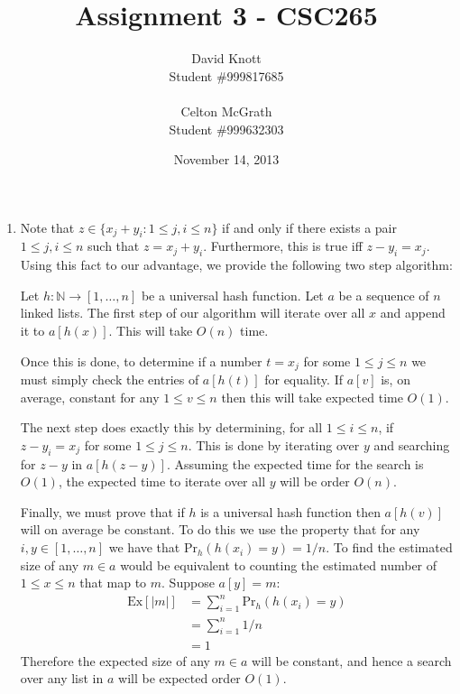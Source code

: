 \documentclass[letterpaper,10pt]{article}
\begin{document}
\title{Assignment 3 - CSC265}
\author{David Knott \\ Student \#999817685 \\ \vspace{-1mm} \\  Celton McGrath \\ Student \#999632303}
\date{November 14, 2013}
\maketitle
\begin{enumerate}
  \item Note that $z \in \{x_j + y_i : 1 \leq j, i \leq n \}$ if and only if there exists a pair $1 \leq j, i \leq n $ such that $z = x_j + y_i$. Furthermore, this is true iff $z - y_i = x_j$. Using this fact to our advantage, we provide the following two step algorithm:

  Let $h : \mathbb{N} \to [1,\dots, n] $ be a universal hash function. Let $a$ be a sequence of $n$ linked lists. The first step of our algorithm will iterate over all $x$ and append it to $a[h(x)]$. This will take $O(n)$ time.

  Once this is done, to determine if a number $t = x_j$ for some $1 \leq j \leq n$ we must simply check the entries of $a[h(t)]$ for equality. If $a[v]$ is, on average, constant for any $1 \leq v \leq n $ then this will take expected time $O(1)$.

  The next step does exactly this by determining, for all $1 \leq i \leq n$, if $z - y_i = x_j$ for some $1 \leq j \leq n$. This is done by iterating over $y$ and searching for $z - y$ in $a[h(z-y)]$. Assuming the expected time for the search is $O(1)$, the expected time to iterate over all $y$ will be order $O(n)$.

  Finally, we must prove that if $h$ is a universal hash function then $a[h(v)]$ will on average be constant. To do this we use the property that for any $i, y \in [1,\dots, n]$ we have that $\mathrm{Pr}_h(h(x_{i}) = y) = 1/n $. To find the estimated size of any $m \in a$ would be equivalent to counting the estimated number of $1 \leq x \leq n$ that map to $m$. Suppose $a[y] = m$:
  \begin{align*}
    \mathrm{Ex} [|m|] & = \sum_{i=1}^n \mathrm{Pr}_h(h(x_{i}) = y) \\
    & = \sum_{i=1}^n 1/n \\
    & = 1
  \end{align*}
  Therefore the expected size of any $m \in a$ will be constant, and hence a search over any list in $a$ will be expected order $O(1)$. 


\end{enumerate}
\end{document}
